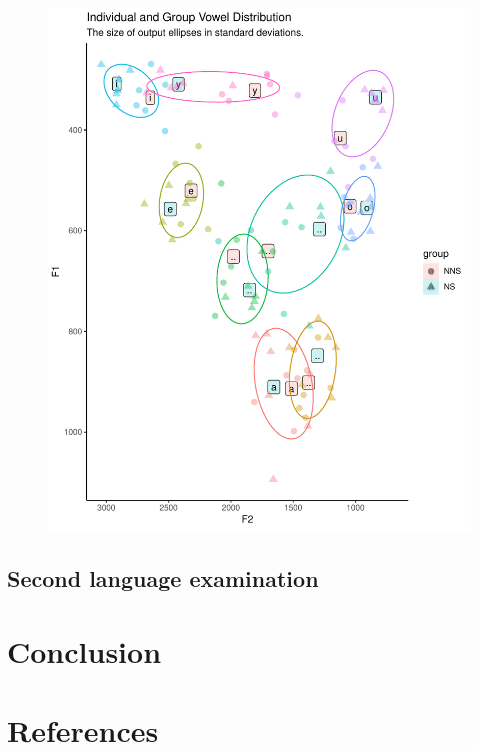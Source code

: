 \documentclass[man, fleqn, noextraspace]{apa6}
\begin{document}
\begin{figure}
\centering
\includegraphics{Vowel_v3_files/figure-latex/figure3-1.pdf}
\caption{}
\end{figure}

\subsection{Second language
examination}\label{second-language-examination}

\section{Conclusion}\label{conclusion}

\newpage

\section{References}\label{references}

\begingroup
\setlength{\parindent}{-0.5in} \setlength{\leftskip}{0.5in}
\end{document}

